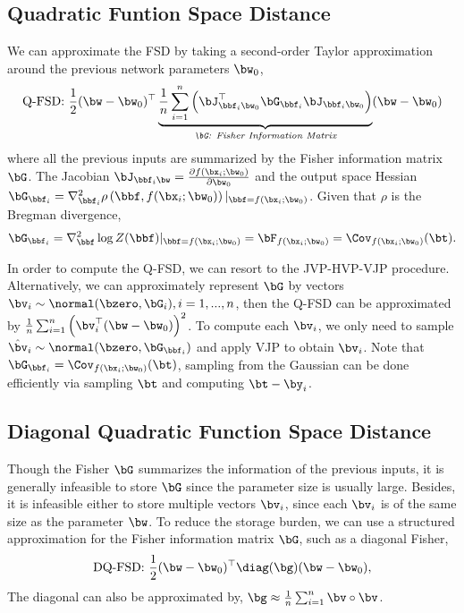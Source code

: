 \subsection{Quadratic Funtion Space Distance}
We can approximate the FSD by taking a second-order Taylor approximation around the previous network parameters $\bw_0$,
\begin{align}
    \text{Q-FSD: } \frac{1}{2}(\bw - \bw_0)^{\top} \underbrace{\frac{1}{n}\sum_{i=1}^n \left( \bJ_{\bbf_i\bw_0}^{\top}\bG_{\bbf_i}\bJ_{\bbf_i\bw_0} \right)}_{\emph{$\bG$: Fisher Information Matrix}} (\bw - \bw_0)
\end{align}
where all the previous inputs are summarized by the Fisher information matrix $\bG$. The Jacobian $\bJ_{\bbf_i\bw} = \frac{\partial f(\bx_i; \bw_0)}{\partial \bw_0}$ and the output space Hessian $\bG_{\bbf_i} = \nabla_{\bbf_i}^2 \rho\left(\bbf, f(\bx_i; \bw_0)\right)\vert_{\bbf=f(\bx_i; \bw_0)}$. Given that $\rho$ is the Bregman divergence,
\begin{align}
    \bG_{\bbf_i} = \nabla_{\bbf}^2 \log Z(\bbf) \vert_{\bbf=f(\bx_i; \bw_0)} = \bF_{f(\bx_i; \bw_0)} = \Cov_{f(\bx_i; \bw_0)}(\bt).
\end{align}

In order to compute the Q-FSD, we can resort to the JVP-HVP-VJP procedure. Alternatively, we can approximately represent $\bG$ by vectors $\bv_i \sim \normal(\bzero, \bG_i), i=1,...,n$, then the Q-FSD can be approximated by $\frac{1}{n}\sum_{i=1}^n\left(\bv_i^{\top}(\bw - \bw_0)\right)^2$. To compute each $\bv_i$, we only need to sample $\hat{\bv}_i \sim \normal(\bzero, \bG_{\bbf_i})$ and apply VJP to obtain $\bv_i$. Note that $\bG_{\bbf_i} = \Cov_{f(\bx_i; \bw_0)}(\bt)$, sampling from the Gaussian can be done efficiently via sampling $\bt$ and computing $\bt - \by_i$.

\subsection{Diagonal Quadratic Function Space Distance}
Though the Fisher $\bG$ summarizes the information of the previous inputs, it is generally infeasible to store $\bG$ since the parameter size is usually large. Besides, it is infeasible either to store multiple vectors $\bv_i$, since each $\bv_i$ is of the same size as the parameter $\bw$. To reduce the storage burden, we can use a structured approximation for the Fisher information matrix $\bG$, such as a diagonal Fisher,
\begin{align}
    \text{DQ-FSD: } \frac{1}{2}(\bw - \bw_0)^{\top} \diag(\bg) (\bw - \bw_0),
\end{align}
The diagonal can also be approximated by, $\bg \approx \frac{1}{n}\sum_{i=1}^n \bv \circ \bv$.

